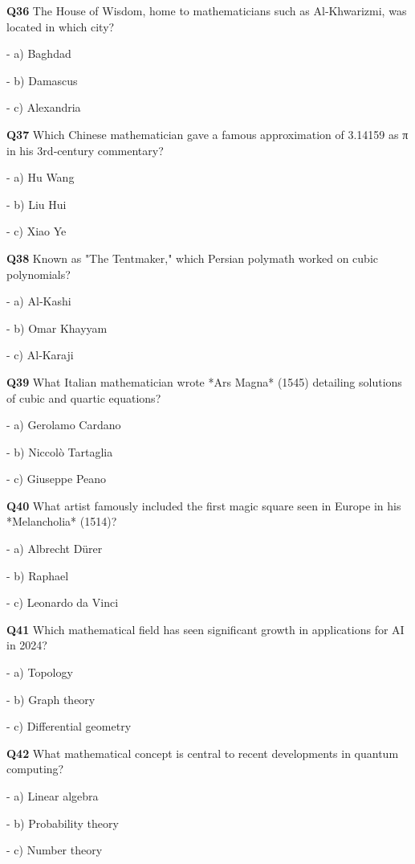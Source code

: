 \textbf{Q36} The House of Wisdom, home to mathematicians such as Al‑Khwarizmi, was located in which city?\par
\quad - a) Baghdad\par
\quad - b) Damascus\par
\quad - c) Alexandria\par

\textbf{Q37} Which Chinese mathematician gave a famous approximation of 3.14159 as π in his 3rd‑century commentary?\par
\quad - a) Hu Wang\par
\quad - b) Liu Hui\par
\quad - c) Xiao Ye\par

\textbf{Q38} Known as "The Tentmaker," which Persian polymath worked on cubic polynomials?\par
\quad - a) Al‑Kashi\par
\quad - b) Omar Khayyam\par
\quad - c) Al‑Karaji\par

\textbf{Q39} What Italian mathematician wrote *Ars Magna* (1545) detailing solutions of cubic and quartic equations?\par
\quad - a) Gerolamo Cardano\par
\quad - b) Niccolò Tartaglia\par
\quad - c) Giuseppe Peano\par

\textbf{Q40} What artist famously included the first magic square seen in Europe in his *Melancholia* (1514)?\par
\quad - a) Albrecht Dürer\par
\quad - b) Raphael\par
\quad - c) Leonardo da Vinci\par

\textbf{Q41} Which mathematical field has seen significant growth in applications for AI in 2024?\par
\quad - a) Topology\par
\quad - b) Graph theory\par
\quad - c) Differential geometry\par

\textbf{Q42} What mathematical concept is central to recent developments in quantum computing?\par
\quad - a) Linear algebra\par
\quad - b) Probability theory\par
\quad - c) Number theory\par

